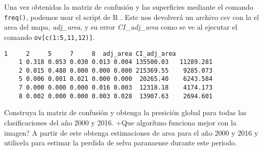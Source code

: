 \begin{exa}
  Una vez obtenidas la matriz de confusi\'on y las superficies mediante el comando \texttt{freq()}, podemos usar el script de R . Este nos devolver\'a un archivo csv con la el area del mapa, \emph{adj\_area}, y su error \emph{CI\_adj\_area} como se ve al ejecutar el comando \texttt{ov[c(1:5,11,12)]}.
  \begin{Verbatim}[fontsize=\small]
          1     2     5     7     8  adj_area CI_adj_area
    1 0.318 0.053 0.030 0.013 0.004 135500.03   11289.281
    2 0.015 0.488 0.000 0.000 0.000 215369.55    9285.073
    5 0.006 0.001 0.021 0.000 0.000  20265.40    6243.584
    7 0.000 0.000 0.000 0.016 0.003  12318.18    4174.173
    8 0.002 0.000 0.000 0.003 0.028  13907.63    2694.601
  \end{Verbatim}
\end{exa}


\begin{act}
    Construya la matriz de confusi\'on y obtenga la presici\'on global para todas las clasificaciones del a\~no 2000 y 2016. +Que algor\'itmo funciona mejor con la imagen? A partir de este obtenga estimaciones de area para el a\~no 2000 y 2016 y utilicela para estimar la perdida de selva paranaense durante este periodo.
\end{act}
